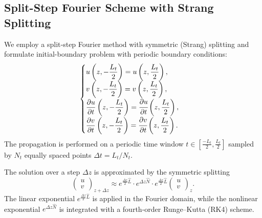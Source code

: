 \documentclass{article}
\begin{document}
        \subsection{Split-Step Fourier Scheme with Strang Splitting}
            We employ a split‑step Fourier method with symmetric (Strang) splitting and formulate initial-boundary problem with periodic boundary conditions:
            \begin{equation}
                \begin{cases}
                    \displaystyle u\left(z, -\frac{L_{t}}{2}\right) = u\left(z, \frac{L_{t}}{2}\right),\\
                    \displaystyle v\left(z, -\frac{L_{t}}{2}\right) = v\left(z, \frac{L_{t}}{2}\right),\\
                    \displaystyle \frac{\partial u}{\partial t}\left(z, -\frac{L_{t}}{2}\right) = \cfrac{\partial u}{\partial t}\left(z, \frac{L_{t}}{2}\right),\\
                    \displaystyle \frac{\partial v}{\partial t}\left(z, -\frac{L_{t}}{2}\right) = \cfrac{\partial v}{\partial t}\left(z, \frac{L_{t}}{2}\right).
                \end{cases}
            \end{equation}
            The propagation is performed on a periodic time window $t\in[\frac{-L_{t}}{2},\frac{L_{t}}{2}]$ sampled by $N_t$ equally spaced points $\Delta t = L_t/N_t$.

            The solution over a step $\Delta z$ is approximated by the symmetric splitting
            \begin{equation}
                \begin{pmatrix} u\\v \end{pmatrix}_{z+\Delta z} \approx
                e^{\frac{\Delta z}{2}\hat L} \cdot
                e^{\Delta z\hat N} \cdot
                e^{\frac{\Delta z}{2}\hat L}
                \begin{pmatrix}u\\v\end{pmatrix}_{z}.
            \end{equation}
            The linear exponential $e^{\frac{\Delta z}{2}\hat L}$ is applied in the Fourier domain,
            while the nonlinear exponential $e^{\Delta z\hat N}$ is integrated with a fourth‑order Runge–Kutta (RK4) scheme.
\end{document}
